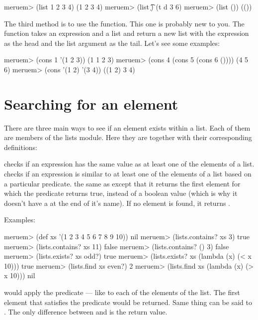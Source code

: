 \begin{REPL}
meruem> (list 1 2 3 4)
(1 2 3 4)
meruem> (list \t \d {})
(t d 3 6)
meruem> (list ())
(())
\end{REPL}

The third method is to use the  function. This one is probably new to you. The  function takes an expression and a list and return a new list with the expression as the head and the list argument as the tail. Let's see some examples:

\begin{REPL}
meruem> (cons 1 '(1 2 3))
(1 1 2 3)
meruem> (cons 4 (cons 5 (cons 6 ())))
(4 5 6)
meruem> (cons '(1 2) '(3 4))
((1 2) 3 4)
\end{REPL}

\section{Searching for an element}
There are three main ways to see if an element exists within a list. Each of them are members of the lists module. Here they are together with their corresponding definitions:

\begin{description}
	 checks if an expression has the same value as at least one of the elements of a list.
	 checks if an expression is similar to at least one of the elements of a list based on a particular predicate.
	 the same as  except that it returns the first element for which the predicate returns true, instead of a boolean value (which is why it doesn't have a  at the end of it's name). If no element is found, it returns .
\end{description}

Examples:

\begin{REPL}
meruem> (def xs '(1 2 3 4 5 6 7 8 9 10))
nil
meruem> (lists.contains? xs 3)
true
meruem> (lists.contains? xs 11)
false
meruem> (lists.contains? () 3)
false
meruem> (lists.exists? xs odd?)
true
meruem> (lists.exists? xs (lambda (x) (< x 10)))
true
meruem> (lists.find xs even?)
2
meruem> (lists.find xs (lambda (x) (> x 10)))
nil
\end{REPL}

 would apply the predicate --- like  to each of the elements of the list. The first element that satisfies the predicate would be returned. Same thing can be said to . The only difference between  and  is the return value.
